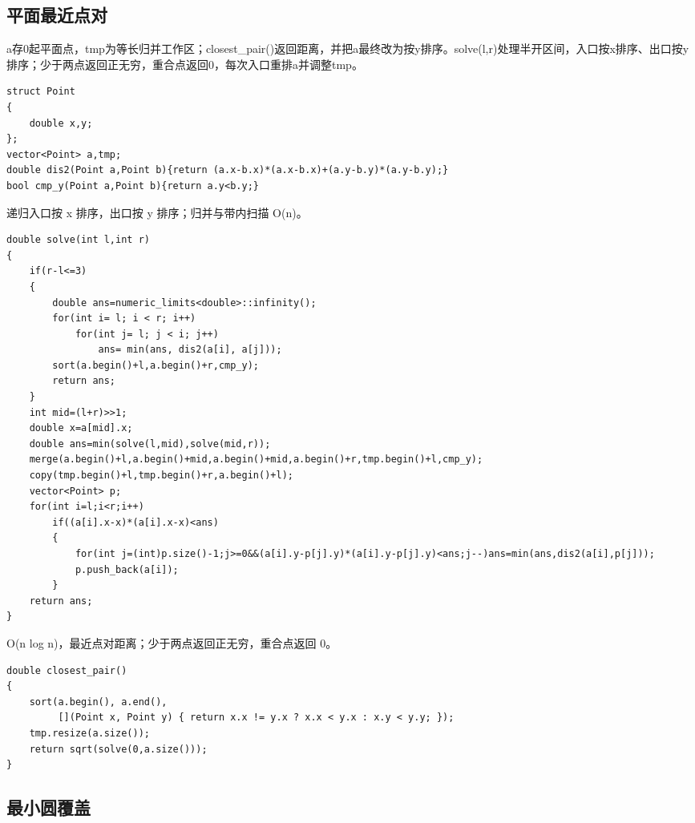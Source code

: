 \documentclass[UTF8,fontset=fandol,a4paper,twoside]{ctexart}
\newcommand{\note}[1]{{\fontsize{10}{12}\selectfont #1\par}}
\begin{document}
\begin{multicols}{2}
\subsection{平面最近点对}

\note{a存0起平面点，tmp为等长归并工作区；closest\_pair(\allowbreak{})\allowbreak{}返回距离，并把a最终改为按y排序。solve(\allowbreak{}l,\allowbreak{}r)\allowbreak{}处理半开区间，入口按x排序、出口按y排序；少于两点返回正无穷，重合点返回0，每次入口重排a并调整tmp。}
\begin{lstlisting}
struct Point
{
    double x,y;
};
vector<Point> a,tmp;
double dis2(Point a,Point b){return (a.x-b.x)*(a.x-b.x)+(a.y-b.y)*(a.y-b.y);}
bool cmp_y(Point a,Point b){return a.y<b.y;}
\end{lstlisting}
\note{递归入口按 x 排序，出口按 y 排序；归并与带内扫描 O(\allowbreak{}n)\allowbreak{}。}
\begin{lstlisting}
double solve(int l,int r)
{
    if(r-l<=3)
    {
        double ans=numeric_limits<double>::infinity();
        for(int i= l; i < r; i++)
            for(int j= l; j < i; j++)
                ans= min(ans, dis2(a[i], a[j]));
        sort(a.begin()+l,a.begin()+r,cmp_y);
        return ans;
    }
    int mid=(l+r)>>1;
    double x=a[mid].x;
    double ans=min(solve(l,mid),solve(mid,r));
    merge(a.begin()+l,a.begin()+mid,a.begin()+mid,a.begin()+r,tmp.begin()+l,cmp_y);
    copy(tmp.begin()+l,tmp.begin()+r,a.begin()+l);
    vector<Point> p;
    for(int i=l;i<r;i++)
        if((a[i].x-x)*(a[i].x-x)<ans)
        {
            for(int j=(int)p.size()-1;j>=0&&(a[i].y-p[j].y)*(a[i].y-p[j].y)<ans;j--)ans=min(ans,dis2(a[i],p[j]));
            p.push_back(a[i]);
        }
    return ans;
}
\end{lstlisting}
\note{O(\allowbreak{}n log n)\allowbreak{}，最近点对距离；少于两点返回正无穷，重合点返回 0。}
\begin{lstlisting}
double closest_pair()
{
    sort(a.begin(), a.end(),
         [](Point x, Point y) { return x.x != y.x ? x.x < y.x : x.y < y.y; });
    tmp.resize(a.size());
    return sqrt(solve(0,a.size()));
}
\end{lstlisting}
\subsection{最小圆覆盖}


\end{multicols}
\end{document}
